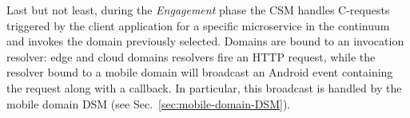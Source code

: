 Last but not least, during the \textit{Engagement} phase the CSM handles C-requests triggered by the client application for a specific microservice in the continuum and invokes the domain previously selected. Domains are bound to an invocation resolver: edge and cloud domains resolvers fire an HTTP request, while the resolver bound to a mobile domain will broadcast an Android event containing the request along with a callback. In particular, this broadcast is handled by the mobile domain DSM (see Sec.~\ref{sec:mobile-domain-DSM}).